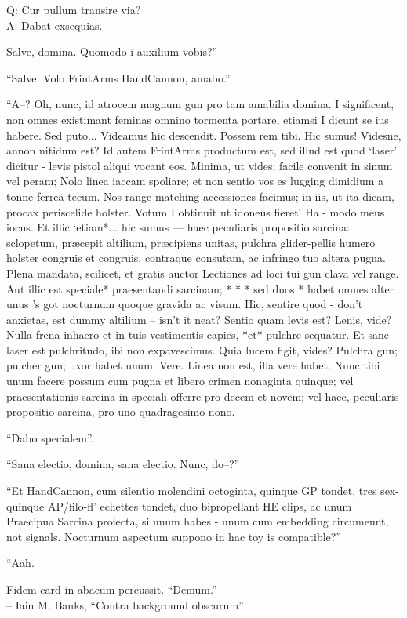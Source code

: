 \documentclass[titlepage,12pt]{memoir}
\begin{document}
Q: Cur pullum transire via?\\
A: Dabat exsequias.

Salve, domina. Quomodo i auxilium vobis?”

“Salve. Volo FrintArms HandCannon, amabo.”

“A--? Oh, nunc, id atrocem magnum gun pro tam amabilia domina. I
significent, non omnes existimant feminas omnino tormenta portare, etiamsi I
dicunt se ius habere. Sed puto... Videamus
hic descendit. Possem rem tibi. Hic sumus!
Videsne, annon nitidum est? Id autem FrintArms productum est,
sed illud est quod ‘laser’ dicitur - levis pistol aliqui vocant
eos. Minima, ut vides; facile convenit in sinum vel peram; Nolo
linea iaccam spoliare; et non sentio vos es lugging dimidium a
tonne ferrea tecum. Nos range matching accessiones facimus;
in iis, ut ita dicam, procax periscelide holster. Votum I
obtinuit ut idoneus fieret! Ha - modo meus iocus. Et
illic ‘etiam*... hic sumus — haec peculiaris propositio sarcina: sclopetum,
præcepit altilium, præcipiens unitas, pulchra glider-pellis humero holster
congruis et congruis, contraque consutam, ac infringo tuo
altera pugna. Plena mandata, scilicet, et gratis auctor
Lectiones ad loci tui gun clava vel range. Aut illic est speciale*
praesentandi sarcinam; * * * sed duos * habet omnes alter unus ’s got
nocturnum quoque gravida ac visum. Hic, sentire quod - don’t
anxietas, est dummy altilium -- isn’t it neat? Sentio quam levis est?
Lenis, vide? Nulla frena inhaero et in tuis vestimentis capies, *et*
pulchre sequatur. Et sane laser est pulchritudo, ibi
non expavescimus. Quia lucem figit, vides? Pulchra gun;
pulcher gun; uxor habet unum. Vere. Linea non est, illa
vere habet. Nunc tibi unum facere possum cum pugna et libero
crimen nonaginta quinque; vel praesentationis sarcina in speciali
offerre pro decem et novem; vel haec, peculiaris propositio sarcina, pro
uno quadragesimo nono.

“Dabo specialem”.

“Sana electio, domina, sana electio. Nunc, do--?”

“Et HandCannon, cum silentio molendini octoginta, quinque GP tondet, tres
sex-quinque AP/filo-fl’ echettes tondet, duo bipropellant HE clips, ac unum
Praecipua Sarcina proiecta, si unum habes - unum cum embedding
circumeunt, not signals. Nocturnum aspectum suppono in hac toy is
compatible?”

“Aah.

Fidem card in abacum percussit. “Demum.”
\\-- Iain M. Banks, “Contra background obscurum”
\end{document}
